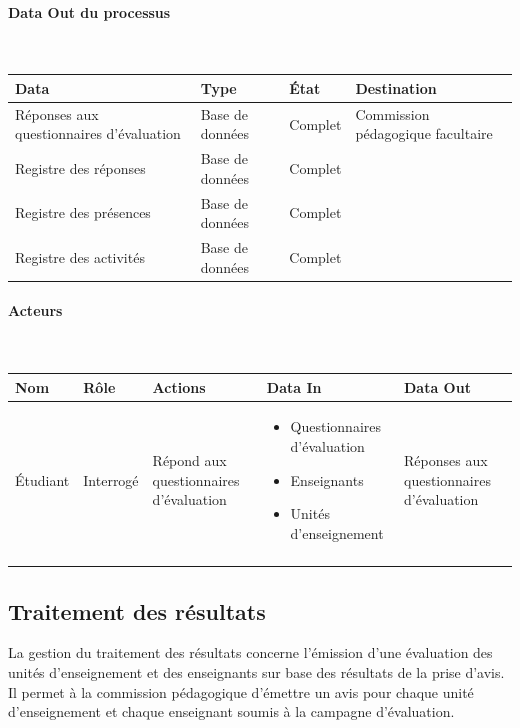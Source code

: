 \documentclass[a4paper,11pt]{report}
\begin{document}
\paragraph{Data Out du processus}~\newline{}

\begin{tabularx}{\linewidth}{|X|X|l|X|} \hline
Data & Type & État & Destination \\ \hline
Réponses aux questionnaires d'évaluation & Base de données & Complet & Commission pédagogique facultaire \\ 
Registre des réponses & Base de données & Complet & \\
Registre des présences & Base de données & Complet & \\
Registre des activités & Base de données & Complet & \\
\hline
\end{tabularx}

\paragraph{Acteurs}~\newline{}

\begin{tabularx}{\linewidth}{|l|X|X|X|X|} \hline
Nom & Rôle & Actions & Data In & Data Out \\ \hline 
Étudiant & Interrogé & Répond aux questionnaires d'évaluation & 
\begin{itemize}
	\item Questionnaires d'évaluation 
	\item Enseignants
	\item Unités d'enseignement
\end{itemize}
& Réponses aux questionnaires d'évaluation \\
 & & & & \\ \hline
\end{tabularx}






\subsection{Traitement des résultats}
La gestion du traitement des résultats concerne l'émission d'une évaluation des unités d'enseignement et des enseignants sur base des résultats de la prise d'avis.
Il permet à la commission pédagogique d'émettre un avis pour chaque unité d'enseignement et chaque enseignant soumis à la campagne d'évaluation.
\end{document}
